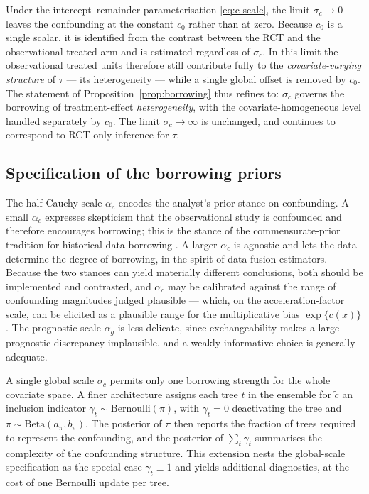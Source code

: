 \begin{remark}
\label{rem:intercept-borrowing}
Under the intercept--remainder parameterisation \eqref{eq:c-scale}, the limit
$\sigma_c \to 0$ leaves the confounding at the constant $c_0$ rather than at
zero. Because $c_0$ is a single scalar, it is identified from the contrast
between the RCT and the observational treated arm and is estimated regardless of
$\sigma_c$. In this limit the observational treated units therefore still
contribute fully to the \emph{covariate-varying structure} of $\tau$ --- its
heterogeneity --- while a single global offset is removed by $c_0$. The
statement of Proposition~\ref{prop:borrowing} thus refines to: $\sigma_c$ governs
the borrowing of treatment-effect \emph{heterogeneity}, with the
covariate-homogeneous level handled separately by $c_0$. The limit
$\sigma_c \to \infty$ is unchanged, and continues to correspond to RCT-only
inference for $\tau$.
\end{remark}

\subsection{Specification of the borrowing priors}

The half-Cauchy scale $\alpha_c$ encodes the analyst's prior stance on
confounding. A small $\alpha_c$ expresses skepticism that the observational
study is confounded and therefore encourages borrowing; this is the stance of
the commensurate-prior tradition for historical-data borrowing
\citep{hobbs2011}. A larger $\alpha_c$ is agnostic and lets the data determine
the degree of borrowing, in the spirit of data-fusion estimators. Because the
two stances can yield materially different conclusions, both should be
implemented and contrasted, and $\alpha_c$ may be calibrated against the range
of confounding magnitudes judged plausible --- which, on the acceleration-factor
scale, can be elicited as a plausible range for the multiplicative bias
$\exp\{c(x)\}$. The prognostic scale $\alpha_g$ is less delicate, since
exchangeability makes a large prognostic discrepancy implausible, and a weakly
informative choice is generally adequate.

\begin{remark}
\label{rem:spike-slab}
A single global scale $\sigma_c$ permits only one borrowing strength for the
whole covariate space. A finer architecture assigns each tree $t$ in the
ensemble for $\tilde c$ an inclusion indicator $\gamma_t \sim
\mathrm{Bernoulli}(\pi)$, with $\gamma_t = 0$ deactivating the tree and
$\pi \sim \mathrm{Beta}(a_\pi, b_\pi)$. The posterior of $\pi$ then reports the
fraction of trees required to represent the confounding, and the posterior of
$\sum_t \gamma_t$ summarises the complexity of the confounding structure. This
extension nests the global-scale specification as the special case
$\gamma_t \equiv 1$ and yields additional diagnostics, at the cost of one
Bernoulli update per tree.
\end{remark}

